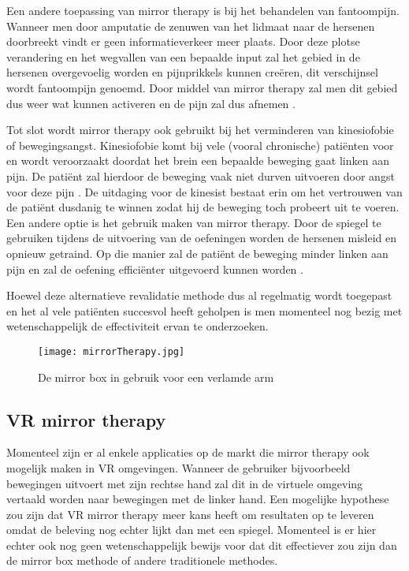 Een andere toepassing van mirror therapy is bij het behandelen van fantoompijn. Wanneer men door amputatie de zenuwen van het lidmaat naar de hersenen doorbreekt vindt er geen informatieverkeer meer plaats. Door deze plotse verandering en het wegvallen van een bepaalde input zal het gebied in de hersenen overgevoelig worden en pijnprikkels kunnen creëren, dit verschijnsel wordt fantoompijn genoemd. Door middel van mirror therapy zal men dit gebied dus weer wat kunnen activeren en de pijn zal dus afnemen \autocite{Veenstra2019}.

Tot slot wordt mirror therapy ook gebruikt bij het verminderen van kinesiofobie of bewegingsangst. Kinesiofobie komt bij vele (vooral chronische) patiënten voor en wordt veroorzaakt doordat het brein een bepaalde beweging gaat linken aan pijn. De patiënt zal hierdoor de beweging vaak niet durven uitvoeren door angst voor deze pijn \autocite{KOCHOA2019}. De uitdaging voor de kinesist bestaat erin om het vertrouwen van de patiënt dusdanig te winnen zodat hij de beweging toch probeert uit te voeren. Een andere optie is het gebruik maken van mirror therapy. Door de spiegel te gebruiken tijdens de uitvoering van de oefeningen worden de hersenen misleid en opnieuw getraind. Op die manier zal de patiënt de beweging minder linken aan pijn en zal de oefening efficiënter uitgevoerd kunnen worden \autocite{Burken2019}.

Hoewel deze alternatieve revalidatie methode dus al regelmatig wordt toegepast en het al vele patiënten succesvol heeft geholpen is men momenteel nog bezig met wetenschappelijk de effectiviteit ervan te onderzoeken.

\begin{figure}[h]
    \centering
    \texttt{[image: mirrorTherapy.jpg]}
    \caption{De mirror box in gebruik voor een verlamde arm \autocite{Saebo2018}}
\end{figure}

\subsection{VR mirror therapy}
Momenteel zijn er al enkele applicaties op de markt die mirror therapy ook mogelijk maken in VR omgevingen. Wanneer de gebruiker bijvoorbeeld bewegingen uitvoert met zijn rechtse hand zal dit in de virtuele omgeving vertaald worden naar bewegingen met de linker hand. Een mogelijke hypothese zou zijn dat VR mirror therapy meer kans heeft om resultaten op te leveren omdat de beleving nog echter lijkt dan met een spiegel. Momenteel is er hier echter ook nog geen wetenschappelijk bewijs voor dat dit effectiever zou zijn dan de mirror box methode of andere traditionele methodes. 

